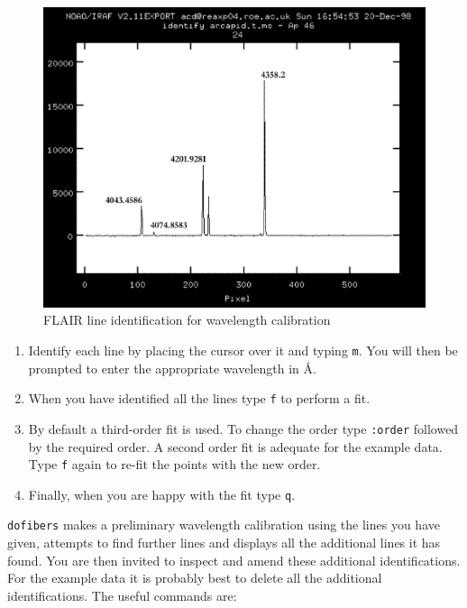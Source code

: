 \documentclass[chapters,twoside,11pt]{starlink}
\begin{document}
\begin{enumerate}
  \begin{figure}[htbp]
     \centering
     \includegraphics[totalheight=4in]{sc14_flair_wave}
     \caption{FLAIR line identification for wavelength calibration
     \label{FLAIR_WAVE} }
  \end{figure}

  \begin{enumerate}

    \item Identify each line by placing the cursor over it and
     typing \texttt{m}.  You will then be prompted to enter the
     appropriate wavelength in \AA.

    \item When you have identified all the lines type \texttt{f} to
     perform a fit.

    \item By default a third-order fit is used.  To change the order
     type \texttt{:order} followed by the required order.  A second
     order fit is adequate for the example data.  Type \texttt{f} again
     to re-fit the points with the new order.

    \item Finally, when you are happy with the fit type \texttt{q}.

  \end{enumerate}

   \texttt{dofibers} makes a preliminary wavelength calibration using the
   lines you have given, attempts to find further lines and displays
   all the additional lines it has found.  You are then invited to inspect
   and amend these additional identifications.  For the example data
   it is probably best to delete all the additional identifications.
   The useful commands are:


\end{enumerate}
\end{document}
